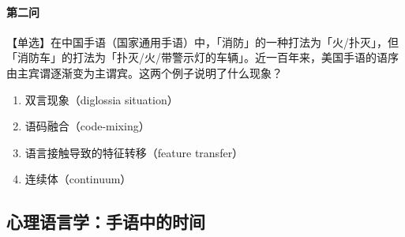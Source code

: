 \documentclass[12pt, a4paper, oneside]{ctexart}
\begin{document}
\paragraph{第二问}
【单选】在中国手语（国家通用手语）中，「消防」的一种打法为「火/扑灭」，但「消防车」的打法为「扑灭/火/带警示灯的车辆」。近一百年来，美国手语的语序由主宾谓逐渐变为主谓宾。这两个例子说明了什么现象？
\begin{enumerate}[label=\Alph*.]
    \item 双言现象（diglossia situation）
    \item 语码融合（code-mixing）
    \item 语言接触导致的特征转移（feature transfer）
    \item 连续体（continuum）
\end{enumerate}

\newpage
\subsection{心理语言学：手语中的时间}

\end{document}
